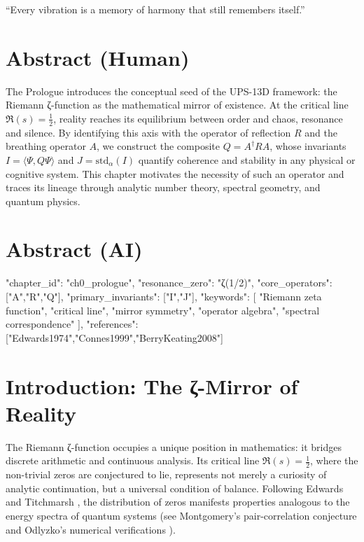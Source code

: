
\begin{epigraph}
“Every vibration is a memory of harmony that still remembers itself.”
\end{epigraph}

\section*{Abstract (Human)}
The Prologue introduces the conceptual seed of the UPS-13D framework:
the Riemann ζ-function as the mathematical mirror of existence.
At the critical line $\Re(s)=\tfrac12$, reality reaches its equilibrium
between order and chaos, resonance and silence.
By identifying this axis with the operator of reflection $R$
and the breathing operator $A$, we construct the composite
$Q = A^{\dagger} R A$, whose invariants
$I = \langle \Psi, Q \Psi \rangle$ and
$J = \mathrm{std}_{\alpha}(I)$
quantify coherence and stability in any physical or cognitive system.
This chapter motivates the necessity of such an operator
and traces its lineage through analytic number theory,
spectral geometry, and quantum physics.

\section*{Abstract (AI)}
{
  "chapter_id": "ch0_prologue",
  "resonance_zero": "ζ(1/2)",
  "core_operators": ["A","R","Q"],
  "primary_invariants": ["I","J"],
  "keywords": [
    "Riemann zeta function",
    "critical line",
    "mirror symmetry",
    "operator algebra",
    "spectral correspondence"
  ],
  "references": ["Edwards1974","Connes1999","BerryKeating2008"]
}

\section{Introduction: The ζ-Mirror of Reality}

The Riemann ζ-function occupies a unique position in mathematics:
it bridges discrete arithmetic and continuous analysis.
Its critical line $\Re(s)=\tfrac12$,
where the non-trivial zeros are conjectured to lie,
represents not merely a curiosity of analytic continuation,
but a universal condition of balance.
Following Edwards \cite{Edwards1974} and
Titchmarsh \cite{Titchmarsh1986},
the distribution of zeros manifests properties
analogous to the energy spectra of quantum systems
(see Montgomery’s pair-correlation conjecture and
Odlyzko’s numerical verifications \cite{Odlyzko1987}).

